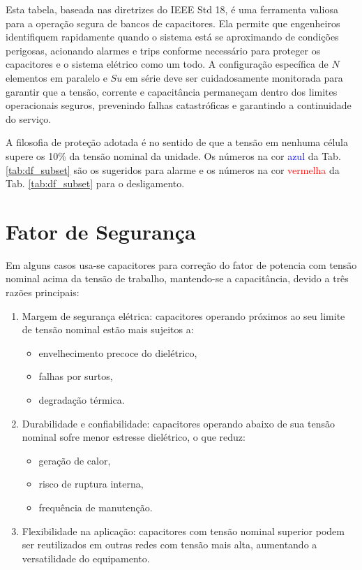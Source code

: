 \documentclass[a4paper]{article}
\begin{document}
Esta tabela, baseada nas diretrizes do IEEE Std 18, é uma ferramenta valiosa para a operação segura de bancos de capacitores. Ela permite que engenheiros identifiquem rapidamente quando o sistema está se aproximando de condições perigosas, acionando alarmes e trips conforme necessário para proteger os capacitores e o sistema elétrico como um todo. A configuração específica de $N$ elementos em paralelo e $Su$ em série deve ser cuidadosamente monitorada para garantir que a tensão, corrente e capacitância permaneçam dentro dos limites operacionais seguros, prevenindo falhas catastróficas e garantindo a continuidade do serviço.


A filosofia de proteção adotada é no sentido de que a tensão em nenhuma célula supere os 10\% da tensão nominal da unidade. Os números na cor \textcolor{blue}{azul} da Tab. \ref{tab:df_subset} são os sugeridos para alarme e os números na cor \textcolor{red}{vermelha} da Tab. \ref{tab:df_subset} para o desligamento.




\section{Fator de Segurança}

Em alguns casos usa-se capacitores para correção do fator de potencia com tensão nominal acima da tensão de trabalho, mantendo-se a capacitância, devido a três razões principais:
\begin{enumerate}
	\item Margem de segurança elétrica: capacitores operando próximos ao seu limite de tensão nominal estão mais sujeitos a:
	\begin{itemize}
		\item envelhecimento precoce do dielétrico,
		\item falhas por surtos,
		\item degradação térmica.
	\end{itemize}
	\item Durabilidade e confiabilidade: capacitores operando abaixo de sua tensão nominal sofre menor estresse dielétrico, o que reduz:
	\begin{itemize}
		\item geração de calor,
		\item risco de ruptura interna,
		\item frequência de manutenção.
	\end{itemize}
	\item Flexibilidade na aplicação: capacitores com tensão nominal superior podem ser reutilizados em outras redes com tensão mais alta, aumentando a versatilidade do equipamento.
\end{enumerate}
\end{document}
